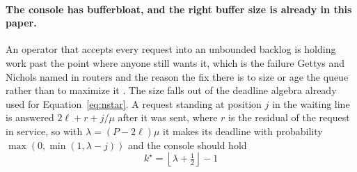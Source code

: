 \documentclass[11pt]{article}
\begin{document}
\paragraph{The console has bufferbloat, and the right buffer size is already in this paper.} An operator that accepts every request into an unbounded backlog is holding work past the point where anyone still wants it, which is the failure Gettys and Nichols named in routers \citep{gettys2012bufferbloat} and the reason the fix there is to size or age the queue rather than to maximize it \citep{nichols2012codel}. The size falls out of the deadline algebra already used for Equation~\ref{eq:nstar}. A request standing at position $j$ in the waiting line is answered $2\ell + r + j/\mu$ after it was sent, where $r$ is the residual of the request in service, so with $\lambda = (P - 2\ell)\mu$ it makes its deadline with probability $\max(0, \min(1, \lambda - j))$ and the console should hold
\[
k^{\star} = \left\lfloor \lambda + \tfrac{1}{2} \right\rfloor - 1
\]
\end{document}
